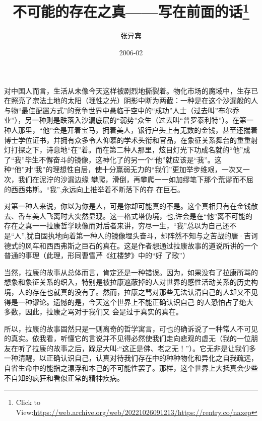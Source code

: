 \documentclass{article}
\title{不可能的存在之真——写在前面的话\footnote{Click to View:\url{https://web.archive.org/web/20221026091213/https://rentry.co/naxep}}}
\author{张异宾}
\date{2006-02}
\begin{document}

\maketitle


\Large

﻿对中国人而言，生活从未像今天这样被剧烈地撕裂着。物化市场的魔域中，生存已在照亮了宗法土地的太阳（理性之光）阴影中断为两截：一种是在这个沙漏般的人与物“最佳配置方式”的竞争世界中悬临于空中的“成功”人士（过去叫”布尔乔业”），另一种则是跌落入沙漏底层的“弱势”众生（过去叫“普罗泰利特”）。在第一种人那里，“他”会是开着宝马，拥着美人，银行户头上有无数的金钱，甚至还揣着博士学位证书，并拥有众多令人仰慕的学术头衔和官品，在象征关系舞台的重重射灯打探之下，诗意地“在”着。而在第二种人那里，炫目灯光下功成名就的“他”成了“我”毕生不懈奋斗的镜像，这神化了的另一个“他”就应该是“我”。这种“他”对“我”的理想性自居，使十分赢弱无力的“我们”更加举步维艰，一次又一次，我们在泥泞的沙漏边缘
\newpage
攀爬，滑倒，再攀爬一一如加缪笔下那个荒谬而不屈的西西弗斯。“我”,永远向上推举着不断落下的存
在巨石。 

对第一种人来说，你以为你是人，可是你却可能真的不是。这个真相只有在金钱散去、香车美人飞离时大突然显现。这一格式塔伪境，也,许会是在“他”离不可能的存在之真一一拉康哲学映像而对后者来讲，穷尽一生，“我”总以为自己还不是“人”,犹自固执地向着第一种人的镜像埋头奋斗，却阵然不知与之苦战的唐·吉诃德式的风车和西西弗斯之巨石的真在。这是作者想通过拉康故事的道说所讲的一个普通的事理（此理，形同曹雪芹《红楼梦》中的“好
了歌”） 

当然，拉康的故事从总体而言，肯定还是一种错误。因为，如果没有了拉康所骂的想象和象征关系的织入，特别是被拉康遮蔽掉的人对世界的感性活动关系的历史构境，人的存在也就真的没有了。然而，拉康之骂对那些无法认清自己的人却又不见得是一种谬论。遗憾的是，今天这个世界上不能正确认识自己
\newpage
的人恐怕占了绝大多数，因此，拉康之骂对于我们又
会是过于真实的真在。 

所以，拉康的故事固然只是一则离奇的哲学寓言，可也的确诉说了一种常人不可见的真实。依我看，听懂它的言说并不见得必然使我们走向悲观的虚无（我的一位朋友在听了拉康的故事之后，跺足大叫:“这正是佛、老之无！”）。它无非是让我们多一种清醒，以正确认识自己，认真对待我们存在中的种种物化和异化之自我疏远，自省生命中的能指之漂浮和本己的不可能性罢了。那样，这个世界上大抵真会少些不自知的疯狂和看似正常的精神疾病。
\end{document}
